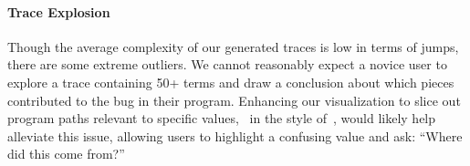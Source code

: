 \paragraph{Trace Explosion}
Though the average complexity of our generated traces is low in terms of
jumps, there are some extreme outliers. We cannot reasonably expect a
novice user to explore a trace containing 50+ terms and draw a
conclusion about which pieces contributed to the bug in their
program. Enhancing our visualization to slice out program paths relevant
to specific values, \eg\ in the style of~\cite{perera_functional_2012},
would likely help alleviate this issue, allowing users to
highlight a confusing value and ask: ``Where did this come from?''




